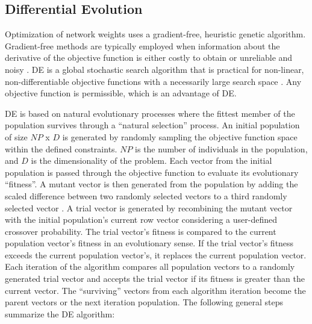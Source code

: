 \subsection{Differential Evolution}
\label{subsec:04de}

Optimization of network weights uses a gradient-free, heuristic genetic algorithm. Gradient-free methods are typically employed when information about the derivative of the objective function is either costly to obtain or unreliable and noisy \citep{conn2009introduction}. \Gls{DE} is a global stochastic search algorithm that is practical for non-linear, non-differentiable objective functions with a necessarily large search space \citep{rios2013derivativefree}. Any objective function is permissible, which is an advantage of \gls{DE}.

\Gls{DE} is based on natural evolutionary processes where the fittest member of the population survives through a ``natural selection'' process. An initial population of size $NP$ x $D$ is generated by randomly sampling the objective function space within the defined constraints. $NP$ is the number of individuals in the population, and $D$ is the dimensionality of the problem. Each vector from the initial population is passed through the objective function to evaluate its evolutionary ``fitness''. A mutant vector is then generated from the population by adding the scaled difference between two randomly selected vectors to a third randomly selected vector \citep{price2013differential}. A trial vector is generated by recombining the mutant vector with the initial population's current row vector considering a user-defined crossover probability. The trial vector's fitness is compared to the current population vector's fitness in an evolutionary sense. If the trial vector's fitness exceeds the current population vector's, it replaces the current population vector. Each iteration of the algorithm compares all population vectors to a randomly generated trial vector and accepts the trial vector if its fitness is greater than the current vector. The ``surviving'' vectors from each algorithm iteration become the parent vectors or the next iteration population. The following general steps summarize the \gls{DE} algorithm:
